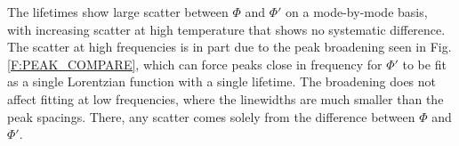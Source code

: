 \documentclass[aps,prb,preprint,superscriptaddress,amsmath,amssymb,floatfix]{revtex4}
\begin{document}
The lifetimes show large scatter between $\Phi$ and $\Phi'$ on a mode-by-mode basis, with increasing scatter at high temperature that shows no systematic difference. The scatter at high frequencies is in part due to the peak broadening seen in Fig$.$ \ref{F:PEAK_COMPARE}, which can force peaks close in frequency for $\Phi'$ to be fit as a single Lorentzian function with a single lifetime. The broadening does not affect fitting at low frequencies, where the linewidths are much smaller than the peak spacings. There, any scatter comes solely from the difference between $\Phi$ and $\Phi'$.

\begin{figure}
\begin{center}

\vspace*{-5mm}

\vspace*{-5mm}

\vspace*{-5mm}


\end{center}
\end{figure}
\end{document}
